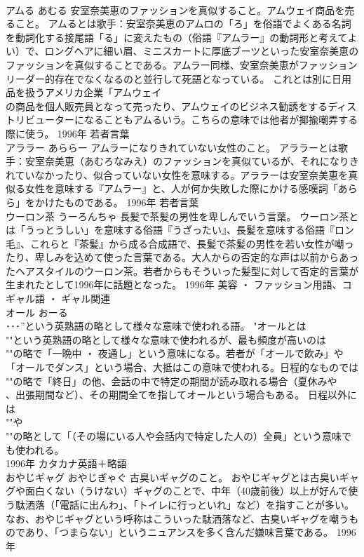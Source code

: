 \documentclass[8pt]{extreport}
\begin{document}
\begin{CJK}{UTF8}{min}
\\	アムる	あむる	安室奈美恵のファッションを真似すること。アムウェイ商品を売ること。	アムるとは歌手：安室奈美恵のアムロの「ろ」を俗語でよくある名詞を動詞化する接尾語「る」に変えたもの（俗語『アムラー』の動詞形と考えてよい）で、ロングヘアに細い眉、ミニスカートに厚底ブーツといった安室奈美恵のファッションを真似することである。アムラー同様、安室奈美恵がファッションリーダー的存在でなくなるのと並行して死語となっている。 これとは別に日用品を扱うアメリカ企業「アムウェイ
\\	の商品を個人販売員となって売ったり、アムウェイのビジネス勧誘をするディストリビューターになることもアムるいう。こちらの意味では他者が揶揄嘲弄する際に使う。	1996年	若者言葉	
\\	アララー	あららー	アムラーになりきれていない女性のこと。	アララーとは歌手：安室奈美恵（あむろなみえ）のファッションを真似ているが、それになりきれていなかったり、似合っていない女性を意味する。アララーは安室奈美恵を真似る女性を意味する『アムラー』と、人が何か失敗した際にかける感嘆詞「あらら」をかけたものである。	1996年	若者言葉	
\\	ウーロン茶	うーろんちゃ	長髪で茶髪の男性を卑しんでいう言葉。	ウーロン茶とは「うっとうしい」を意味する俗語『うざったい』、長髪を意味する俗語『ロン毛』、これらと『茶髪』から成る合成語で、長髪で茶髪の男性を若い女性が嘲ったり、卑しみを込めて使った言葉である。大人からの否定的な声は以前からあったヘアスタイルのウーロン茶。若者からもそういった髪型に対して否定的言葉が生まれたとして1996年に話題となった。	1996年	美容 ・ ファッション用語、コギャル語 ・ ギャル関連	
\\	オール	おーる	
\\	･･･”という英熟語の略として様々な意味で使われる語。	"オールとは
\\	""という英熟語の略として様々な意味で使われるが、最も頻度が高いのは
\\	""の略で「一晩中 ・ 夜通し」という意味になる。若者が「オールで飲み」や「オールでダンス」という場合、大抵はこの意味で使われる。日程的なものでは
\\	""の略で「終日」の他、会話の中で特定の期間が読み取れる場合（夏休みや
\\	、出張期間など）、その期間全てを指してオールという場合もある。 日程以外には
\\	""や
\\	""の略として「（その場にいる人や会話内で特定した人の）全員」という意味でも使われる。
\\	1996年	カタカナ英語＋略語	
\\	おやじギャグ	おやじぎゃぐ	古臭いギャグのこと。	おやじギャグとは古臭いギャグや面白くない（うけない）ギャグのことで、中年（40歳前後）以上が好んで使う駄洒落（「電話に出んわ」、「トイレに行っといれ」など）を指すことが多い。なお、おやじギャグという呼称はこういった駄洒落など、古臭いギャグを嘲うものであり、「つまらない」というニュアンスを多く含んだ嫌味言葉である。	1996年	

\end{CJK}
\end{document}
